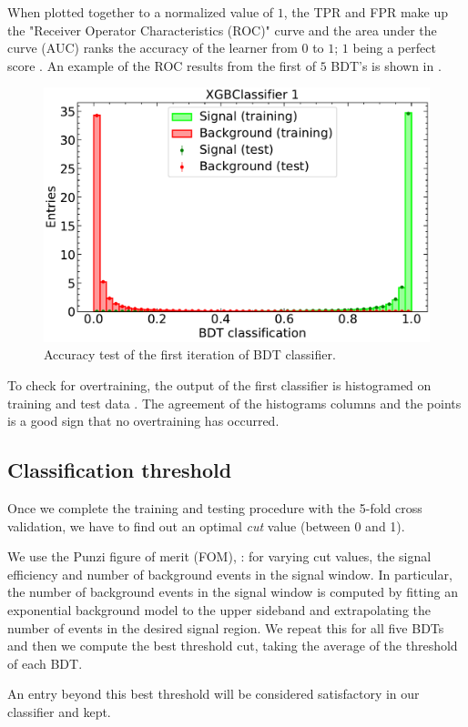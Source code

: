 When plotted together to a normalized value of $1$, the TPR and FPR make up the "Receiver Operator Characteristics (ROC)" curve and the area under the curve (AUC) ranks the accuracy of the learner from $0$ to $1$; $1$ being a perfect score \cite{roc}. An example of the ROC results from the first of $5$ BDT's is shown in .

\begin{figure}[H]
    \centering
    \includegraphics[width=0.6\linewidth]{graphs/train_test0.pdf}
    \caption{Accuracy test of the first iteration of BDT classifier.}
    \label{traintest}
\end{figure}

To check for overtraining, the output of the first classifier is histogramed on training and test data . The agreement of the histograms columns and the points is a good sign that no overtraining has occurred.

\subsection{Classification threshold}
Once we complete the training and testing procedure with the 5-fold cross validation, we have to find out an optimal \emph{cut} value (between 0 and 1).

We use the Punzi figure of merit (FOM), : for varying cut values, the signal efficiency and number of  background events in the signal window. In particular, the number of background events in the signal window is computed by fitting an exponential background model to the upper sideband and extrapolating the number of events in the desired signal region. We repeat this for all five BDTs and then we compute the best threshold cut, taking the average of the threshold of each BDT.

An entry beyond this best threshold will be considered satisfactory in our classifier and kept.

